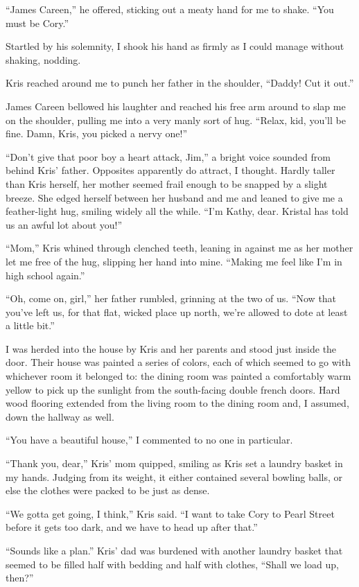 ``James Careen,'' he offered, sticking out a meaty hand for me to shake.  ``You must be Cory.''

Startled by his solemnity, I shook his hand as firmly as I could manage without shaking, nodding.

Kris reached around me to punch her father in the shoulder, ``Daddy!  Cut it out.''

James Careen bellowed his laughter and reached his free arm around to slap me on the shoulder, pulling me into a very manly sort of hug.  ``Relax, kid, you'll be fine.  Damn, Kris, you picked a nervy one!''

``Don't give that poor boy a heart attack, Jim,'' a bright voice sounded from behind Kris' father.  Opposites apparently do attract, I thought.  Hardly taller than Kris herself, her mother seemed frail enough to be snapped by a slight breeze.  She edged herself between her husband and me and leaned to give me a feather-light hug, smiling widely all the while.  ``I'm Kathy, dear.  Kristal has told us an awful lot about you!''

``Mom,'' Kris whined through clenched teeth, leaning in against me as her mother let me free of the hug, slipping her hand into mine.  ``Making me feel like I'm in high school again.''

``Oh, come on, girl,'' her father rumbled, grinning at the two of us.  ``Now that you've left us, for that flat, wicked place up north, we're allowed to dote at least a little bit.''

I was herded into the house by Kris and her parents and stood just inside the door.  Their house was painted a series of colors, each of which seemed to go with whichever room it belonged to: the dining room was painted a comfortably warm yellow to pick up the sunlight from the south-facing double french doors.  Hard wood flooring extended from the living room to the dining room and, I assumed, down the hallway as well.

``You have a beautiful house,'' I commented to no one in particular.

``Thank you, dear,'' Kris' mom quipped, smiling as Kris set a laundry basket in my hands.  Judging from its weight, it either contained several bowling balls, or else the clothes were packed to be just as dense.

``We gotta get going, I think,'' Kris said.  ``I want to take Cory to Pearl Street before it gets too dark, and we have to head up after that.''

``Sounds like a plan.''  Kris' dad was burdened with another laundry basket that seemed to be filled half with bedding and half with clothes, ``Shall we load up, then?''

